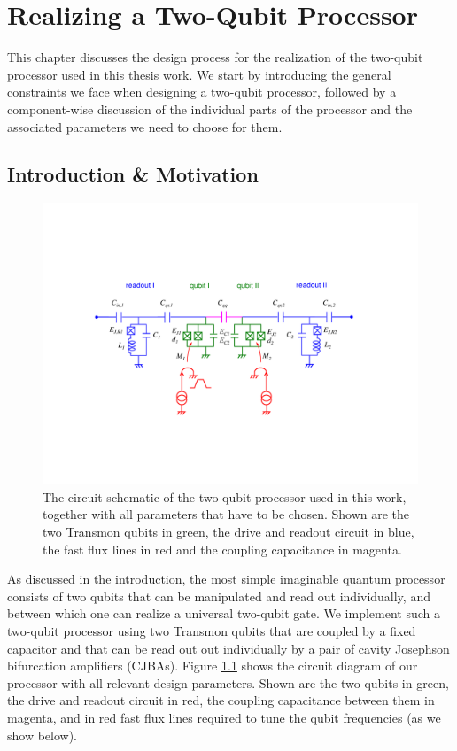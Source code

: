 \chapter{Realizing a Two-Qubit Processor} \label{chapter:design}

This chapter discusses the design process for the realization of the two-qubit processor used in this thesis work. We start by introducing the general constraints we face when designing a two-qubit processor, followed by a component-wise discussion of the individual parts of the processor and the associated parameters we need to choose for them.

\section{Introduction \& Motivation}

\begin{figure}[ht!]
  \centering
	\includegraphics[width=1.\textwidth]{"./material/figures/2-qubit-processor/processor_schematic_parameters"}
	\caption[Circuit schematic of the two-qubit processor]{The circuit schematic of the two-qubit processor used in this work, together with all parameters that have to be chosen. Shown are the two Transmon qubits in green, the drive and readout circuit in blue, the fast flux lines in red and the coupling capacitance in magenta.}
	\label{fig:2_qubit_chip_circuit_diagram}
\end{figure}

As discussed in the introduction, the most simple imaginable quantum processor consists of two qubits that can be manipulated and read out individually, and between which one can realize a universal two-qubit gate. We implement such a two-qubit processor using two Transmon qubits that are coupled by a fixed capacitor and that can be read out out individually by a pair of cavity Josephson bifurcation amplifiers (CJBAs). Figure \ref{fig:2_qubit_chip_circuit_diagram} shows the circuit diagram of our processor with all relevant design parameters. Shown are the two qubits in green, the drive and readout circuit in red, the coupling capacitance between them in magenta, and in red fast flux lines required to tune the qubit frequencies (as we show below).

